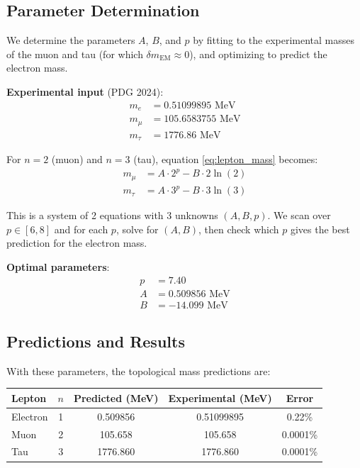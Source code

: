 \documentclass[12pt,a4paper]{article}
\begin{document}
\subsection{Parameter Determination}

We determine the parameters $A$, $B$, and $p$ by fitting to the experimental masses of the muon and tau (for which $\delta m_{\text{EM}} \approx 0$), and optimizing to predict the electron mass.

\textbf{Experimental input} (PDG 2024):
\begin{align}
    m_e &= 0.51099895 \text{ MeV} \\
    m_\mu &= 105.6583755 \text{ MeV} \\
    m_\tau &= 1776.86 \text{ MeV}
\end{align}

For $n=2$ (muon) and $n=3$ (tau), equation \eqref{eq:lepton_mass} becomes:
\begin{align}
    m_\mu &= A \cdot 2^p - B \cdot 2 \ln(2) \\
    m_\tau &= A \cdot 3^p - B \cdot 3 \ln(3)
\end{align}

This is a system of 2 equations with 3 unknowns $(A, B, p)$. We scan over $p \in [6, 8]$ and for each $p$, solve for $(A, B)$, then check which $p$ gives the best prediction for the electron mass.

\textbf{Optimal parameters}:
\begin{align}
    p &= 7.40 \\
    A &= 0.509856 \text{ MeV} \\
    B &= -14.099 \text{ MeV}
\end{align}

\subsection{Predictions and Results}

With these parameters, the topological mass predictions are:

\begin{center}
\begin{tabular}{lcccc}
\hline
Lepton & $n$ & Predicted (MeV) & Experimental (MeV) & Error \\
\hline
Electron & 1 & 0.509856 & 0.51099895 & 0.22\% \\
Muon & 2 & 105.658 & 105.658 & 0.0001\% \\
Tau & 3 & 1776.860 & 1776.860 & 0.0001\% \\
\hline
\end{tabular}
\end{center}
\end{document}

